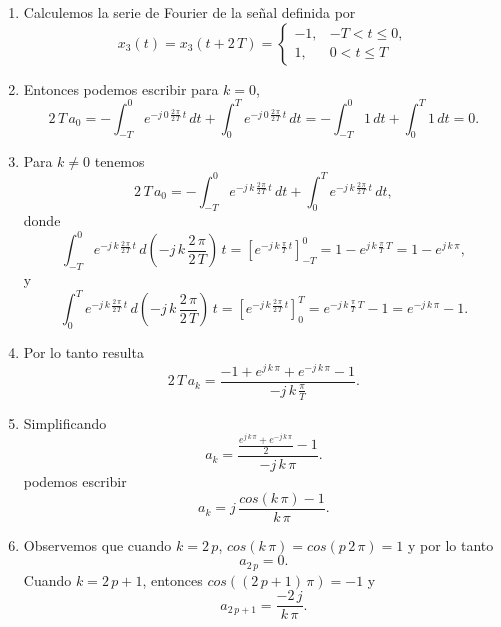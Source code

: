 \begin{enumerate}
\item  Calculemos la serie de Fourier de la se\~{n}al definida por 
\begin{equation}
x_{3}\left( t\right) = x_{3}\left(t + 2 \, T \right) = 
\left\{ 
\begin{array}{cc}
-1, & -T<t \leq 0, \\ 
1, & 0 < t \leq T
\end{array}
\right.
\end{equation}

\item Entonces podemos escribir para $k = 0$,
\begin{equation}
	2 \, T \, a_{0}=
	-\int_{-T}^{0}e^{-j \, 0 \, \frac{2 \, \pi }{2 \, T} \, t} \, dt + 
	\int_{0}^{T}e^{-j \, 0 \, \frac{2 \, \pi }{2 \, T} \, t} \, dt =
	-\int_{-T}^{0} 1 \, dt + 
\int_{0}^{T} 1 \, dt = 0.
\end{equation}

\item Para $k \neq 0$ tenemos
\begin{equation}
	2 \, T \, a_{0}=
	-\int_{-T}^{0}e^{-j \, k \, \frac{2 \, \pi }{2 \, T} \, t} \, dt + 
	\int_{0}^{T}e^{-j \, k \, \frac{2 \, \pi }{2 \, T} \, t} \, dt,
\end{equation}
donde
\begin{equation}
	\int_{-T}^{0}e^{-j \, k \, \frac{2 \, \pi }{2 \, T} \, t} \, d (-j \, k \, \frac{2 \, \pi }{2 \, T})\,t = \left[e^{-j \, k \, \frac{\pi }{T} \, t}\right]_{-T}^{0} = 1 - e^{j \, k \, \frac{\pi }{T} \, T} = 1 - e^{j \, k \, \pi},
\end{equation}
y
\begin{equation}
	\int_{0}^{T}e^{-j \, k \, \frac{2 \, \pi }{2 \, T} \, t} \, d(-j \, k \, \frac{2 \, \pi }{2 \, T}) \, t = \left[e^{-j \, k \, \frac{2 \, \pi }{2 \, T} \, t}\right]_{0}^{T} = e^{-j \, k \, \frac{\pi }{T} \, T} - 1 = e^{-j \, k \, \pi} - 1.
\end{equation}

\item Por lo tanto resulta
\begin{equation}
 2 \, T \, a_{k}=
 \frac{- 1 + e^{j \, k \, \pi} + e^{-j \, k \, \pi} - 1}{-j \, k \, \frac{\pi}{T}}.
\end{equation}
\item Simplificando
\begin{equation}
	a_{k}=
	\frac{\frac{e^{j \, k \, \pi} + e^{-j \, k \, \pi}}{2} - 1}{-j \, k \, \pi}.
\end{equation}
podemos escribir
\begin{equation}
 a_{k}= j \, 
 \frac{cos(k \, \pi) - 1}{k \, \pi}.
\end{equation}
\item Observemos que cuando $k = 2 \, p$, $cos(k \, \pi) = cos(p \, 2 \, \pi) = 1$ y por lo tanto 
\begin{equation}a_{2 \, p} = 0.\end{equation}
Cuando $k = 2 \, p + 1$, entonces $cos((2 \, p + 1) \, \pi) = -1$ y 
\begin{equation}a_{2 \, p + 1} = \frac{-2 \, j}{k \, \pi}.\end{equation}


\end{enumerate}
